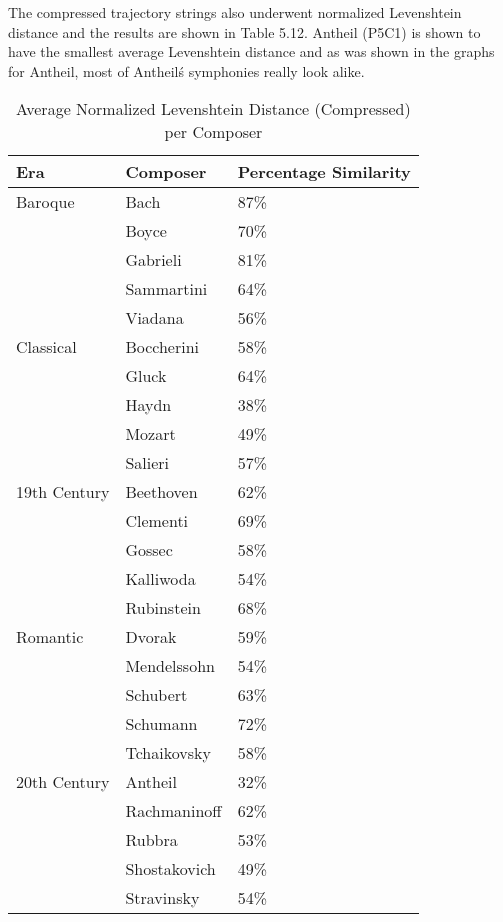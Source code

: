 The compressed trajectory strings also underwent normalized Levenshtein distance and the results are shown in Table 5.12. Antheil (P5C1) is shown to have the smallest average Levenshtein distance and as was shown in the graphs for Antheil, most of Antheil\'s symphonies really look alike.

\begin{longtable}{|l|l|l|}
\caption{Average Normalized Levenshtein Distance (Compressed) per Composer}
\label{my-label}\\
\hline
Era & Composer & Percentage Similarity \\ \hline
\endfirsthead
%
\endhead
%
Baroque & Bach & 87\% \\ \hline
 & Boyce & 70\% \\ \hline
 & Gabrieli & 81\% \\ \hline
 & Sammartini & 64\% \\ \hline
 & Viadana & 56\% \\ \hline
Classical & Boccherini & 58\% \\ \hline
 & Gluck & 64\% \\ \hline
 & Haydn & 38\% \\ \hline
 & Mozart & 49\% \\ \hline
 & Salieri & 57\% \\ \hline
19th Century & Beethoven & 62\% \\ \hline
 & Clementi & 69\% \\ \hline
 & Gossec & 58\% \\ \hline
 & Kalliwoda & 54\% \\ \hline
 & Rubinstein & 68\% \\ \hline
Romantic & Dvorak & 59\% \\ \hline
 & Mendelssohn & 54\% \\ \hline
 & Schubert & 63\% \\ \hline
 & Schumann & 72\% \\ \hline
 & Tchaikovsky & 58\% \\ \hline
20th Century & Antheil & 32\% \\ \hline
 & Rachmaninoff & 62\% \\ \hline
 & Rubbra & 53\% \\ \hline
 & Shostakovich & 49\% \\ \hline
 & Stravinsky & 54\% \\ \hline
\end{longtable}

